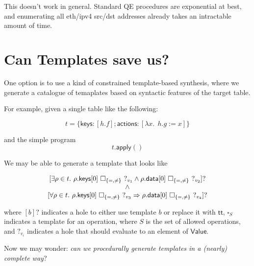 \documentclass{article}
\newcommand{\TRUE}{\mathsf{tt}}
\newcommand{\Value}{\mathsf{Value}}
\newcommand{\actions}{\mathsf{actions}}
\newcommand{\keys}{\mathsf{keys}}
\newcommand{\data}{\mathsf{data}}
\newcommand{\apply}{\mathsf{apply}}
\begin{document}
This doesn't work in general. Standard QE procedures are exponential at best, and
enumerating all eth/ipv4 src/dst addresses already takes an intractable amount
of time.

\section{Can Templates save us?}

One option is to use a kind of constrained template-based synthesis, where we
generate a catalogue of temaplates based on syntactic features of the target table.

For example, given a single table like the following:

\[t = \{\keys: [h.f]; \actions: [\lambda x.~~h.g:= x]\}\]

and the simple program \[t.\apply()\]

We may be able to generate a template that looks like

\[\begin{array}{>{\displaystyle}c}
  {[\exists \rho \in t.~ \rho.\keys[0]~\square_{\{=,\neq\}}~?_{v_1}\wedge \rho.\data[0]~\square_{\{=,\neq\}}~?_{v_2} ]?} \\
  \wedge\\
  {[\forall \rho \in t.~\rho.\keys[0]~\square_{\{=,\neq\}}~?_{v_3} \Rightarrow \rho.\data[0]~\square_{\{=,\neq\}}~?_{v_4}]?}
\end{array}\]

where $[b]?$ indicates a hole to either use template $b$ or replace it with
$\TRUE$, $\square_S$ indicates a template for an operation, where $S$ is the set
of allowed operations, and $?_{v_i}$ indicates a hole that should evaluate to an element
of $\Value$.

Now we may wonder: \emph{can we procedurally generate templates in a (nearly) complete way}?
\end{document}
